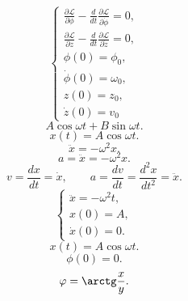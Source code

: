 \documentclass[a4paper]{article}
\title{}
\begin{document}
	\maketitle
	\[
		\left\{
		\begin{aligned}
			\frac{\partial \mathcal{L}}{\partial \phi}- \frac{d}{dt}\frac{\partial \mathcal{L}}{\partial \dot{\phi}}=0, \\
		\frac{\partial \mathcal{L}}{\partial z}- \frac{d}{dt}\frac{\partial \mathcal{L}}{\partial \dot{z}}=0,\\
		\phi(0)=\phi_0,\\
		\dot{\phi}(0)=\omega_0,\\
		z(0)=z_0,\\
		\dot{z}(0)=v_0
		\end{aligned}
		\right.
	\] 
\[
A \cos \omega t + B \sin \omega t
.\] 
\[
	x(t)=A \cos \omega t
.\] 
\[
	\ddot{x}=-\omega^2 x
.\] 
\[
	a=\ddot{x}= -\omega^2 x
.\] 
\[
	v=\frac{dx}{dt}=\dot{x},\qquad a= \frac{dv}{dt}=
	\frac{d^2 x}{dt^2}=\ddot{x}
.\] 
\[
\left\{
\begin{aligned}
	\ddot{x}=-\omega^2 t,\\
	x(0)=A,\\
	\dot{x}(0)=0.
\end{aligned}
\right.
\] 
\[
	x(t)=A \cos \omega t
.\] 
\[
	\phi(0)=0
.\] 
\[
\phi= \arctg \frac{x}{y}
.\] 
\end{document}
